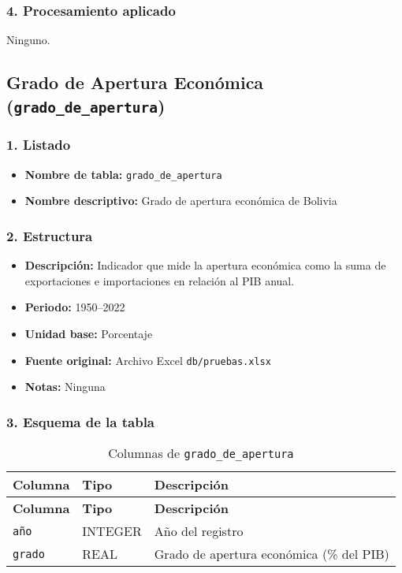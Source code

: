 \documentclass[12pt,a4paper]{article}
\begin{document}
\subsubsection*{4. Procesamiento aplicado}
Ninguno.

\newpage
\subsection{Grado de Apertura Económica (\texttt{grado\_de\_apertura})}

\subsubsection*{1. Listado}
\begin{itemize}
  \item \textbf{Nombre de tabla:} \texttt{grado\_de\_apertura}
  \item \textbf{Nombre descriptivo:} Grado de apertura económica de Bolivia
\end{itemize}

\subsubsection*{2. Estructura}
\begin{itemize}
  \item \textbf{Descripción:} Indicador que mide la apertura económica como la suma de exportaciones e importaciones en relación al PIB anual.
  \item \textbf{Periodo:} 1950--2022
  \item \textbf{Unidad base:} Porcentaje
  \item \textbf{Fuente original:} Archivo Excel \texttt{db/pruebas.xlsx}
  \item \textbf{Notas:} Ninguna
\end{itemize}

\subsubsection*{3. Esquema de la tabla}
\begin{longtable}{@{}lll@{}}
\caption{Columnas de \texttt{grado\_de\_apertura}}\\
\toprule
\textbf{Columna} & \textbf{Tipo} & \textbf{Descripción} \\
\midrule
\endfirsthead
\toprule
\textbf{Columna} & \textbf{Tipo} & \textbf{Descripción} \\
\midrule
\endhead
\bottomrule
\endfoot
\texttt{año}   & INTEGER & Año del registro \\
\texttt{grado} & REAL    & Grado de apertura económica (\% del PIB) \\
\end{longtable}
\end{document}
